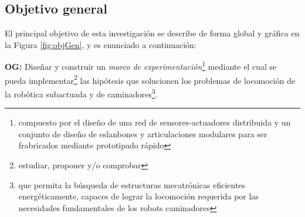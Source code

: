 \subsection[General]{Objetivo general}
\label{sec:objgen}
El principal objetivo de esta investigaci\'on se describe de forma global y gr\'afica en la Figura \ref{fig:objGen}, y es enunciado a continuaci\'on:\par
\textbf{OG:} Dise\~nar y construir un \emph{marco de experimentaci\'on}\footnote{compuesto por el dise\~no de una red de sensores-actuadores distribuida y un conjunto de dise\~no de eslanbones y articulaciones modulares para ser frabricados mediante prototipado r\'apido} mediante el cual se pueda implementar\footnote{estudiar, proponer y/o comprobar} las hip\'otesis que solucionen los problemas de locomoci\'on de la rob\'otica subactuada y de caminadores\footnote{que permita la b\'usqueda de estructuras mecatr\'onicas eficientes energ\'eticamente, capaces de lograr la locomoci\'on requerida por las necesidades fundamentales de los robots caminadores}.\par
